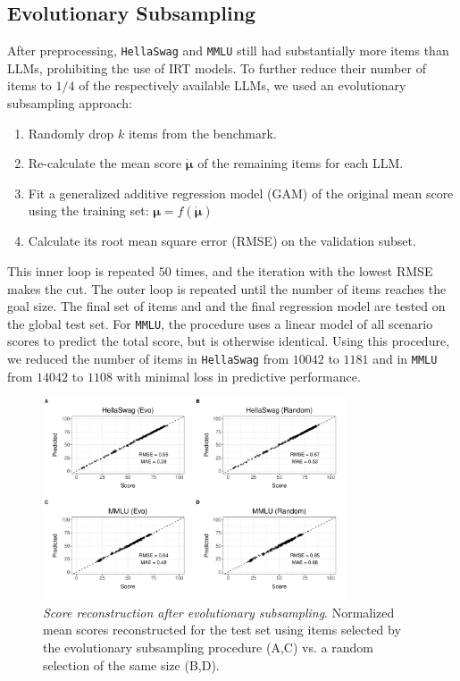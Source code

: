 \documentclass{article}
\begin{document}
\subsection{Evolutionary Subsampling}
After preprocessing, \texttt{HellaSwag} and \texttt{MMLU} still had substantially more items than LLMs, prohibiting the use of IRT models. To further reduce their number of items to $1/4$ of the respectively available LLMs, we used an evolutionary subsampling approach:
\begin{enumerate}
   \item Randomly drop $k$ items from the benchmark.
   \item Re-calculate the mean score $\dot {\boldsymbol{\mu}}$ of the remaining items for each LLM.
   \item Fit a generalized additive regression model (GAM) of the original mean score using the training set: $\boldsymbol\mu = f(\dot{\boldsymbol\mu})$ 
   \item Calculate its root mean square error (RMSE) on the validation subset.
\end{enumerate}
This inner loop is repeated $50$ times, and the iteration with the lowest RMSE makes the cut. The outer loop is repeated until the number of items reaches the goal size. The final set of items and and the final regression model are tested on the global test set. For \texttt{MMLU}, the procedure uses a linear model of all scenario scores to predict the total score, but is otherwise identical.
Using this procedure, we reduced the number of items in \texttt{HellaSwag} from $10042$ to $1181$ and in \texttt{MMLU} from $14042$ to $1108$ with minimal loss in predictive performance.
\begin{figure}[h]
   \centering
   \includegraphics[width=0.8\textwidth]{figures/evo.pdf}
   \caption{\textit{Score reconstruction after evolutionary subsampling}. Normalized mean scores reconstructed for the test set using items selected by the evolutionary subsampling procedure (A,C) vs. a random selection of the same size (B,D).}
   \label{fig:hs-reduced}
\end{figure}
\end{document}
